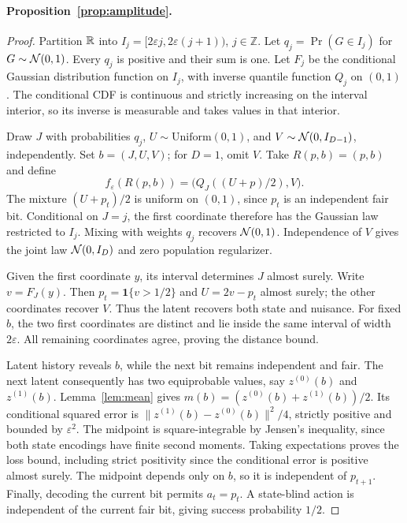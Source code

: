 \paragraph{Proposition~\ref{prop:amplitude}.}
\begin{proof}
Partition $\mathbb{R}$ into $I_j=[2\varepsilon j,2\varepsilon(j+1))$, $j\in\mathbb Z$.
Let $q_j=\Pr(G\in I_j)$ for $G\sim\mathcal{N}(0,1)$.
Every $q_j$ is positive and their sum is one.
Let $F_j$ be the conditional Gaussian distribution function on $I_j$, with inverse quantile function $Q_j$ on $(0,1)$.
The conditional CDF is continuous and strictly increasing on the interval interior, so its inverse is measurable and takes values in that interior.

Draw $J$ with probabilities $q_j$, $U\sim\mathrm{Uniform}(0,1)$, and $V\sim\mathcal{N}(0,I_{D-1})$, independently.
Set $b=(J,U,V)$; for $D=1$, omit $V$.
Take $R(p,b)=(p,b)$ and define
\begin{equation}
f_\varepsilon(R(p,b))=\big(Q_J((U+p)/2),V\big).
\end{equation}
The mixture $(U+p_t)/2$ is uniform on $(0,1)$, since $p_t$ is an independent fair bit.
Conditional on $J=j$, the first coordinate therefore has the Gaussian law restricted to $I_j$.
Mixing with weights $q_j$ recovers $\mathcal{N}(0,1)$.
Independence of $V$ gives the joint law $\mathcal{N}(0,I_D)$ and zero population regularizer.

Given the first coordinate $y$, its interval determines $J$ almost surely.
Write $v=F_J(y)$.
Then $p_t=\mathbf1\{v>1/2\}$ and $U=2v-p_t$ almost surely; the other coordinates recover $V$.
Thus the latent recovers both state and nuisance.
For fixed $b$, the two first coordinates are distinct and lie inside the same interval of width $2\varepsilon$.
All remaining coordinates agree, proving the distance bound.

Latent history reveals $b$, while the next bit remains independent and fair.
The next latent consequently has two equiprobable values, say $z^{(0)}(b)$ and $z^{(1)}(b)$.
Lemma~\ref{lem:mean} gives $m(b)=(z^{(0)}(b)+z^{(1)}(b))/2$.
Its conditional squared error is $\|z^{(1)}(b)-z^{(0)}(b)\|^2/4$, strictly positive and bounded by $\varepsilon^2$.
The midpoint is square-integrable by Jensen's inequality, since both state encodings have finite second moments.
Taking expectations proves the loss bound, including strict positivity since the conditional error is positive almost surely.
The midpoint depends only on $b$, so it is independent of $p_{t+1}$.
Finally, decoding the current bit permits $a_t=p_t$.
A state-blind action is independent of the current fair bit, giving success probability $1/2$.
\end{proof}


